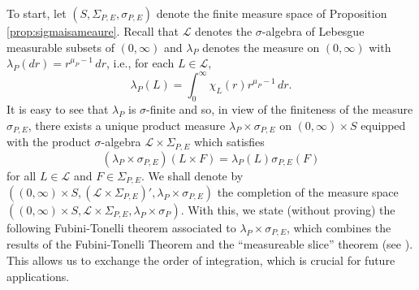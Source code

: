 \documentclass[11pt, letter]{book}
\begin{document}
\noindent To start, let $(S,\Sigma_{P,E},\sigma_{P,E})$ denote the finite measure space of Proposition \ref{prop:sigmaisameaure}. Recall that $\mathcal{L}$ denotes the $\sigma$-algebra of Lebesgue measurable subsets of $(0,\infty)$ and  $\lambda_P$ denotes the measure on $(0,\infty)$ with $\lambda_P(dr)=r^{\mu_P-1}\,dr$, i.e., for each $L\in\mathcal{L}$,
\begin{equation*}
\lambda_P(L)=\int_0^\infty \chi_L(r)r^{\mu_P-1}\,dr.
\end{equation*}
It is easy to see that $\lambda_P$ is $\sigma$-finite and so, in view of the finiteness of the measure $\sigma_{P,E}$, there exists a unique product measure $\lambda_P\times\sigma_{P,E}$ on $(0,\infty)\times S$ equipped with the product $\sigma$-algebra $\mathcal{L}\times\Sigma_{P,E}$ which satisfies
\begin{equation*}
    (\lambda_P\times\sigma_{P,E})(L\times F)=\lambda_P(L)\sigma_{P,E}(F)
\end{equation*}
for all $L\in\mathcal{L}$ and $F\in\Sigma_{P,E}$. We shall denote by $((0,\infty)\times S,(\mathcal{L}\times\Sigma_{P,E})', \lambda_P\times\sigma_{P,E})$ the completion of the measure space $((0,\infty)\times S,\mathcal{L}\times\Sigma_{P,E},\lambda_P \times\sigma_P)$. With this, we state (without proving) the following Fubini-Tonelli theorem associated to $\lambda_P\times \sigma_{P,E}$, which combines the results of the Fubini-Tonelli Theorem and the ``measureable slice'' theorem (see \cite{folland_real_2013}). This allows us to exchange the order of integration, which is crucial for future applications.
\end{document}
